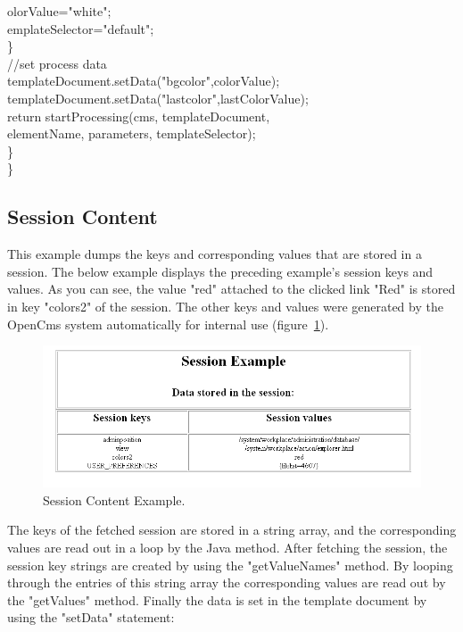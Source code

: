 \begin{java}
\jtabe                        olorValue="white";\\
\jtabe                        emplateSelector="default";\\
\jtabb        \}\\
\jtabb        //set process data\\
\jtabb        templateDocument.setData("bgcolor",colorValue);\\
\jtabb        templateDocument.setData("lastcolor",lastColorValue);\\
return startProcessing(cms, templateDocument,\\
elementName, parameters, templateSelector);\\
\}\\
\}\\
\end{java}

\subsection {Session Content}
This example dumps the keys and corresponding values that are stored in
a session. The below example displays the preceding example's session
keys and values. As you can see, the value "red" attached to the clicked
link "Red" is stored in key "colors2" of the session. The other keys and
values were generated by the OpenCms system automatically for internal
use (figure~\ref{SessionExample3}).

\begin{figure}
\begin{center}
\includegraphics[clip,width=\sgw]{pics/modules/36}
\end{center}
\caption[Session Content Example]{Session Content Example.}
\label{SessionExample3}
\end{figure}

The keys of the fetched session are stored in a string array, and the
corresponding values are read out in a loop by the Java method. After
fetching the session, the session key strings are created by using the
{\meth "getValueNames"} method. By looping through the entries of this string
array the corresponding values are read out by the {\meth "getValues"} method.
Finally the data is set in the template document by using the {\name "setData"}
statement:

